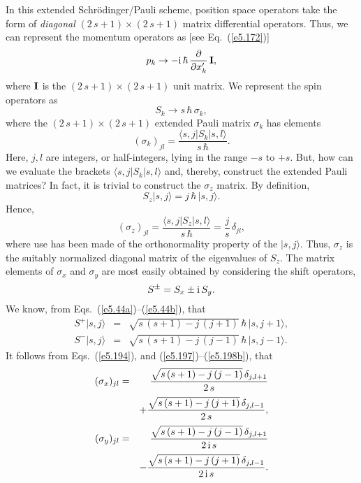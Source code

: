In this extended Schr\"{o}dinger/Pauli
scheme, position space operators take the form of {\em diagonal} $(2\,s+1) \times (2\,s+1)$
matrix differential operators. Thus, we can represent the momentum operators
as [see
Eq.~(\ref{e5.172})]
\begin{equation}
p_k \rightarrow -{\rm i}\,\hbar \,\frac{\partial}{\partial x_k'}\, {\bf I},
\end{equation}
where ${\bf I}$ is the $(2\,s+1)\times (2\,s+1)$ unit matrix.
 We represent the spin
operators as
\begin{equation}
S_k \rightarrow s\,\hbar \,\sigma_k,
\end{equation}
where the $(2\,s+1)\times (2\,s+1)$ extended Pauli matrix $\sigma_k$ has elements
\begin{equation}\label{e5.194}
(\sigma_k)_{jl} = \frac{ \langle s, j|S_k | s, l\rangle}{s\,\hbar}.
\end{equation}
Here, $j, l$ are integers, or half-integers, lying in the range $-s$ to $+s$. 
But, how can we evaluate the brackets $\langle s, j|S_k | s, l\rangle$
and, thereby, construct the extended Pauli matrices? In fact, it is trivial
to construct the $\sigma_z$ matrix. By definition,
\begin{equation}
S_z | s, j\rangle = j\,\hbar\, | s, j\rangle.
\end{equation}
Hence, 
\begin{equation}\label{e5.196}
(\sigma_z)_{jl} = \frac{\langle s, j|S_z | s, l\rangle}{s\,\hbar}
= \frac{j}{s}\, \delta_{jl},
\end{equation}
where use has been made of the orthonormality property of the $| s, j\rangle$.
Thus, $\sigma_z$ is the suitably normalized diagonal matrix of the eigenvalues
of $S_z$. The matrix elements of $\sigma_x$ and $\sigma_y$ are most easily
obtained by considering the shift operators,
\begin{equation}\label{e5.197}
S^\pm = S_x \pm {\rm i}\, S_y.
\end{equation}
We know, from Eqs.~(\ref{e5.44a})--(\ref{e5.44b}), that
\begin{eqnarray}\label{e5.198a}
S^+ |s, j\rangle &=& \sqrt{s\,(s+1) - j \,(j+1)} \,\hbar\, |s, j+1\rangle,\\[0.5ex]
S^- |s, j\rangle &=& \sqrt{s\,(s+1) - j \,(j-1)}\, \hbar \,|s, j-1\rangle.\label{e5.198b}
\end{eqnarray} 
It follows from Eqs.~(\ref{e5.194}), and (\ref{e5.197})--(\ref{e5.198b}), that
\begin{eqnarray}\label{e5.199a}
(\sigma_x)_{jl} &=& \frac{\sqrt{ s\,(s+1) - j\,(j-1)} \,\delta_{j, l+1}}{2\,s}\nonumber\\[0.5ex]
&&+ \frac{\sqrt{s\,(s+1) - j\,(j+1)}\,\delta_{j, l-1} }{2\,s},\\[0.5ex]
(\sigma_y)_{jl} &=& \frac{\sqrt{ s\,(s+1) - j\,(j-1)} \,\delta_{j, l+1}}{2\,{\rm i}\,s}\nonumber\\[0.5ex]
&&- \frac{\sqrt{s\,(s+1) - j\,(j+1)}\,\delta_{j, l-1} }{2\,{\rm i}\,s}.\label{e5.199b}
\end{eqnarray}
